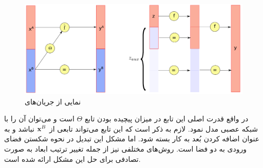 \begin{figure}[H]
    \centering
    \includegraphics[width=.7\textwidth]{images/flow-survey1.png}
    \caption{
        نمایی از جریان‌های \coupling{}
        \cite{flow_survey}	}
    \label{fig:chap2:flow_coupling}
\end{figure}

در واقع قدرت اصلی این تابع در میزان پیچیده بودن تابع $\Theta$ است و می‌توان آن را با شبکه عصبی مدل نمود. لازم به ذکر است که این تابع می‌تواند تابعی از ${\bf x}^B$ نباشد و به عنوان اضافه کردن بُعد به کار بسته شود. اما مشکل این تبدیل در نحوه شکستن فضای ورودی به دو فضا است. روش‌های مختلفی نیز از جمله تغییر ترتیب ابعاد به صورت تصادفی برای حل این مشکل ارائه شده است.

